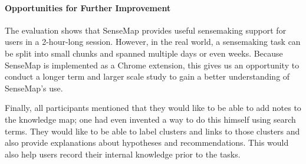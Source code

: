 \paragraph{Opportunities for Further Improvement}
The evaluation shows that SenseMap provides useful sensemaking support for users in a 2-hour-long session. However, in the real world, a sensemaking task can be split  into small chunks and spanned multiple days or even weeks. Because SenseMap is implemented as a Chrome extension, this gives us an opportunity to conduct a longer term and larger scale study to gain a better understanding of SenseMap's use.

Finally, all participants mentioned that they would like to be able to add notes to the knowledge map; one had even invented a way to do this himself using search terms. They would like to be able to label clusters and links to those clusters and also provide explanations about hypotheses and recommendations. This would also help users record their internal knowledge prior to the tasks.